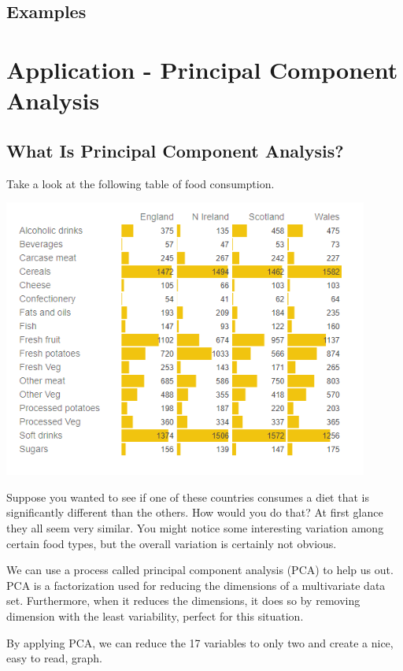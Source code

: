 \documentclass{article}
\begin{document}
\subsection{Examples}

\newpage
\section{Application - Principal Component Analysis}
\subsection{What Is Principal Component Analysis?}
Take a look at the following table of food consumption.

\begin{center}
\includegraphics[width=12cm]{(17)}
\end{center}


Suppose you wanted to see if one of these countries consumes a diet that is significantly different than the others. How would you do that? At first glance they all seem very similar. You might notice some interesting variation among certain food types, but the overall variation is certainly not obvious.
\bigskip

We can use a process called principal component analysis (PCA) to help us out. PCA is a factorization used for reducing the dimensions of a multivariate data set. Furthermore, when it reduces the dimensions, it does so by removing dimension with the least variability, perfect for this situation.
\bigskip

By applying PCA, we can reduce the 17 variables to only two and create a nice, easy to read, graph.
\end{document}
